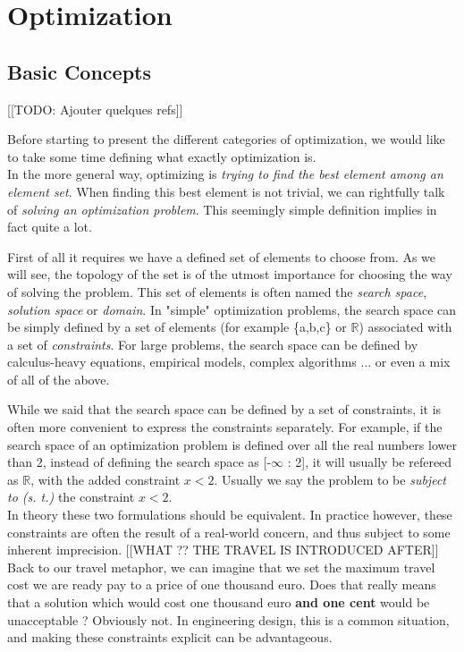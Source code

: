 
\part{Optimization}

\chapter{Basic Concepts}

[[TODO: Ajouter quelques refs]]

Before starting to present the different categories of optimization, we would like to take some time defining what exactly optimization is.\\
In the more general way, optimizing is \emph{trying to find the best element among an element set}. When finding this best element is not trivial, we can rightfully talk of \emph{solving an optimization problem}. This seemingly simple definition implies in fact quite a lot.

First of all it requires we have a defined set of elements to choose from. As we will see, the topology of the set is of the utmost importance for choosing the way of solving the problem. This set of elements is often named the \emph{search space}, \emph{solution space} or \emph{domain}. In "simple" optimization problems, the search space can be simply defined by a set of elements (for example \{a,b,c\} or \ensuremath{\mathbb{R}}) associated with a set of \emph{constraints}. For large problems, the search space can be defined by calculus-heavy equations, empirical models, complex algorithms ... or even a mix of all of the above.


While we said that the search space can be defined by a set of constraints, it is often more convenient to express the constraints separately. For example, if the search space of an optimization problem is defined over all the real numbers lower than 2, instead of defining the search space as [-\(\infty\) : 2], it will usually be refereed as \(\mathbb{R}\), with the added constraint \(x < 2\). Usually we say the problem to be \emph{subject to (s. t.)} the constraint \(x < 2\).\\
In theory these two formulations should be equivalent. In practice however, these constraints are often the result of a real-world concern, and thus subject to some inherent imprecision. [[WHAT ?? THE TRAVEL IS INTRODUCED AFTER]] Back to our travel metaphor, we can imagine that we set the maximum travel cost we are ready pay to a price of one thousand euro. Does that really means that a solution which would cost one thousand euro \textbf{and one cent} would be unacceptable ? Obviously not.  In engineering design, this is a common situation, and making these constraints explicit can be advantageous.

